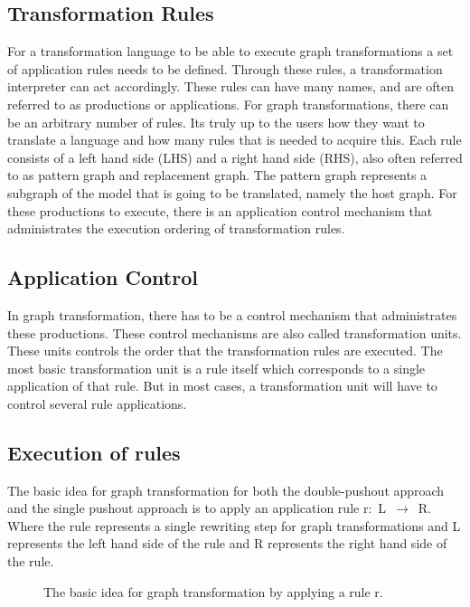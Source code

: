 \subsection{Transformation Rules}
For a transformation language to be able to execute graph
transformations a set of application rules needs to be defined. Through these
rules, a transformation interpreter can act accordingly. These rules can have
many names, and are often referred to as productions or applications. For graph
transformations, there can be an arbitrary number of rules. Its truly up to the
users how they want to translate a language and how many rules that is needed
to acquire this. Each rule consists of a left hand side (LHS) and a right hand
side (RHS), also often referred to as pattern graph and replacement graph. The
pattern graph represents a subgraph of the model that is going to be translated,
namely the host graph. For these productions to execute, there is an application
control mechanism that administrates the execution ordering of transformation
rules. 

\subsection{Application Control}
In graph transformation, there has to be a control mechanism that
administrates these productions. These control mechanisms are also called
transformation units. These units controls the order that the transformation
rules are executed. The most basic transformation unit is a rule itself which
corresponds to a single application of that rule. But in most cases, a
transformation unit will have to control several rule applications. 

\subsection{Execution of rules}
The basic idea for graph transformation for both the double-pushout
approach and the single pushout approach is to apply an application rule
\mbox{r: L $\longrightarrow$ R}. Where the rule represents a single rewriting
step for graph transformations and L represents the left hand side of the rule and R
represents the right hand side of the rule.

\begin{figure}[H]
	\centering
	\caption[Idea of graph transformation]
	{The basic idea for graph transformation by applying a rule r.}
	\label{fig:GraphTransformationGeneral}
\end{figure}

